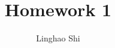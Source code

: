 \documentclass[preprint,12pt,authoryear]{elsarticle}
\begin{document}
\begin{frontmatter}
\title{Homework 1} %


\author{Linghao Shi} 
\end{frontmatter}


 

\end{document}
